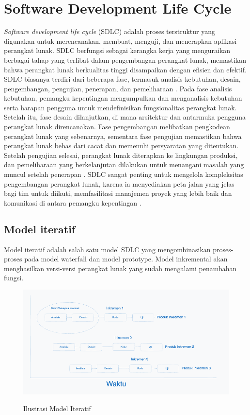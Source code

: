 \section{Software Development Life Cycle}
\emph{Software development life cycle} (SDLC) adalah proses terstruktur yang digunakan untuk merencanakan, membuat, menguji, dan menerapkan aplikasi perangkat lunak. SDLC berfungsi sebagai kerangka kerja yang menguraikan berbagai tahap yang terlibat dalam pengembangan perangkat lunak, memastikan bahwa perangkat lunak berkualitas tinggi disampaikan dengan efisien dan efektif. SDLC biasanya terdiri dari beberapa fase, termasuk analisis kebutuhan, desain, pengembangan, pengujian, penerapan, dan pemeliharaan \citep{chan2020devops}.
\singlespacing{}
Pada fase analisis kebutuhan, pemangku kepentingan mengumpulkan dan menganalisis kebutuhan serta harapan pengguna untuk mendefinisikan fungsionalitas perangkat lunak. Setelah itu, fase desain dilanjutkan, di mana arsitektur dan antarmuka pengguna perangkat lunak direncanakan. Fase pengembangan melibatkan pengkodean perangkat lunak yang sebenarnya, sementara fase pengujian memastikan bahwa perangkat lunak bebas dari cacat dan memenuhi persyaratan yang ditentukan. Setelah pengujian selesai, perangkat lunak diterapkan ke lingkungan produksi, dan pemeliharaan yang berkelanjutan dilakukan untuk menangani masalah yang muncul setelah penerapan \citep{chan2020devops}.
\singlespacing{}
SDLC sangat penting untuk mengelola kompleksitas pengembangan perangkat lunak, karena ia menyediakan peta jalan yang jelas bagi tim untuk diikuti, memfasilitasi manajemen proyek yang lebih baik dan komunikasi di antara pemangku kepentingan \citep{chan2020devops}.

\subsection{Model iteratif}

Model iteratif adalah salah satu model SDLC yang mengombinasikan proses-proses pada model waterfall dan model prototype. Model inkremental akan menghasilkan versi-versi perangkat lunak yang sudah mengalami penambahan fungsi.

\begin{figure}[htbp]
  \centering
  \includegraphics[width=0.85\linewidth]{images/bab-2/sdlc-iterative.png}
  \caption{Ilustrasi Model Iteratif}\label{fig:iterative-model}\citep{sukamto}
\end{figure}
